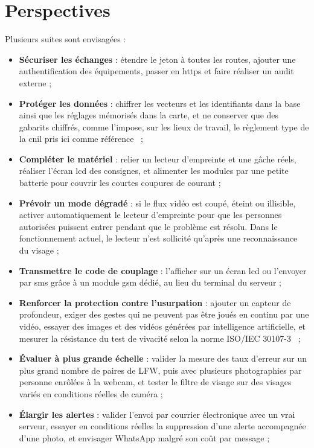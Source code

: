 \section{Perspectives}\label{sec:perspectives}

\begin{maj}
Plusieurs suites sont envisagées :
\begin{itemize}
  \item \textbf{Sécuriser les échanges} : étendre le jeton à toutes les routes, ajouter une authentification des équipements, passer en \gls{https} et faire réaliser un audit externe ;
  \item \textbf{Protéger les données} : chiffrer les vecteurs et les identifiants dans la base ainsi que les réglages mémorisés dans la carte, et ne conserver que des gabarits chiffrés, comme l'impose, sur les lieux de travail, le règlement type de la \gls{cnil} pris ici comme référence~\cite{cnil2019reglementtype} ;
  \item \textbf{Compléter le matériel} : relier un lecteur d'empreinte et une gâche réels, réaliser l'écran \gls{lcd} des consignes, et alimenter les modules par une petite batterie pour couvrir les courtes coupures de courant ;
  \item \textbf{Prévoir un mode dégradé} : si le flux vidéo est coupé, éteint ou illisible, activer automatiquement le lecteur d'empreinte pour que les personnes autorisées puissent entrer pendant que le problème est résolu. Dans le fonctionnement actuel, le lecteur n'est sollicité qu'après une reconnaissance du visage ;
  \item \textbf{Transmettre le code de couplage} : l'afficher sur un écran \gls{lcd} ou l'envoyer par \gls{sms} grâce à un module \gls{gsm} dédié, au lieu du terminal du serveur ;
  \item \textbf{Renforcer la protection contre l'usurpation} : ajouter un capteur de profondeur, exiger des gestes qui ne peuvent pas être joués en continu par une vidéo, essayer des images et des vidéos générées par intelligence artificielle, et mesurer la résistance du test de vivacité selon la norme ISO/IEC 30107-3~\cite{iso30107} ;
  \item \textbf{Évaluer à plus grande échelle} : valider la mesure des taux d'erreur sur un plus grand nombre de paires de LFW, puis avec plusieurs photographies par personne enrôlées à la webcam, et tester le filtre de visage sur des visages variés en conditions réelles de caméra ;
  \item \textbf{Élargir les alertes} : valider l'envoi par courrier électronique avec un vrai serveur, essayer en conditions réelles la suppression d'une alerte accompagnée d'une photo, et envisager WhatsApp malgré son coût par message ;

\end{itemize}
\end{maj}
